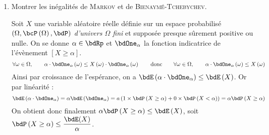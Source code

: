 \documentclass[a4paper,french,bookmarks]{article}
\begin{document}
    \begin{enumerate}
        \item Montrer les inégalités de \textsc{Markov} et de
        \textsc{Bienaymé}-\textsc{Tchebychev}.
        
        \noafter
        \nobefore
        \begin{nproof}
            Soit $X$ une variable aléatoire réelle définie sur un espace probabilisé
            $(\Omega, \bcP\left(\Omega\right),\bdP)$ \textit{d'univers $\Omega$ fini}
            et supposée presque sûrement positive ou nulle. On se donne $\alpha \in \bdRp$ et
            $\bdOne_\alpha$ la fonction indicatrice de l'évènement $\left[X \geq \alpha\right]$.
            \[ \forall \omega \in \Omega,\qquad \alpha \cdot \bdOne_\alpha\left(\omega\right)
            \leq X\left(\omega\right) \cdot \bdOne_\alpha\left(\omega\right)
            \qquad\text{donc}\qquad \forall \omega \in \Omega,\qquad \alpha \cdot
            \bdOne_\alpha\left(\omega\right) \leq X\left(\omega\right)\]
            Ainsi par croissance de l'espérance, on a $\bdE\left(\alpha \cdot
            \bdOne_\alpha\right) \leq \bdE\left(X\right)$. Or par linéarité : 
            \[ \bdE\left(\alpha \cdot \bdOne_\alpha\right) = \alpha
            \bdE\left(\bdOne_\alpha\right) = a\left( 1 \times \bdP\left(X \geq \alpha\right)
            + 0 \times \bdP\left(X < \alpha\right)\right) = 
            \alpha\bdP\left(X \geq \alpha\right) \]
            On obtient donc finalement $\alpha \bdP\left(X \geq \alpha\right) \leq
            \bdE\left(X\right)$, soit $\bdP\left(X\geq \alpha\right) \leq
            \dfrac{\bdE(X)}{\alpha}$.
        \end{nproof}
\end{enumerate}
\end{document}
